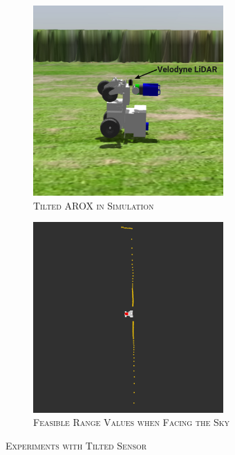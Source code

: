 \documentclass[english, master, utf8]{base/thesis_KBS}
\begin{document}
\begin{figure}[H]
    \centering
    \begin{subfigure}[b]{0.49\textwidth}
        \centering
        \includegraphics[width=0.8\textwidth]{pics/tilted_AROX.png}
        \caption{\textsc{Tilted AROX in Simulation}}
        \label{fig:tilted_AROX}
    \end{subfigure}
    \hfill
    \begin{subfigure}[b]{0.49\textwidth}
        \centering
        \includegraphics[width=0.8\textwidth]{pics/straight_line.png}
        \caption{\textsc{Feasible Range Values when Facing the Sky}}
        \label{fig:straight_line}
    \end{subfigure}
\caption{\textsc{Experiments with Tilted Sensor}}
\label{fig:prototype_sim}
\end{figure}
\end{document}
